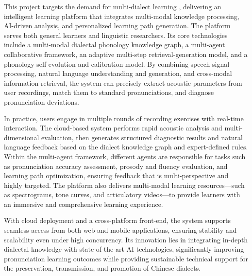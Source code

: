 \begin{abstract*}
This project targets the demand for multi-dialect learning , delivering an intelligent learning platform that integrates multi-modal knowledge processing, AI-driven analysis, and personalized learning path generation. The platform serves both general learners and linguistic researchers. Its core technologies include a multi-modal dialectal phonology knowledge graph, a multi-agent collaborative framework, an adaptive multi-step retrieval-generation model, and a phonology self-evolution and calibration model. By combining speech signal processing, natural language understanding and generation, and cross-modal information retrieval, the system can precisely extract acoustic parameters from user recordings, match them to standard pronunciations, and diagnose pronunciation deviations.

In practice, users engage in multiple rounds of recording exercises with real-time interaction. The cloud-based system performs rapid acoustic analysis and multi-dimensional evaluation, then generates structured diagnostic results and natural language feedback based on the dialect knowledge graph and expert-defined rules. Within the multi-agent framework, different agents are responsible for tasks such as pronunciation accuracy assessment, prosody and fluency evaluation, and learning path optimization, ensuring feedback that is multi-perspective and highly targeted. The platform also delivers multi-modal learning resources—such as spectrograms, tone curves, and articulatory videos—to provide learners with an immersive and comprehensive learning experience.

With cloud deployment and a cross-platform front-end, the system supports seamless access from both web and mobile applications, ensuring stability and scalability even under high concurrency. Its innovation lies in integrating in-depth dialectal knowledge with state-of-the-art AI technologies, significantly improving pronunciation learning outcomes while providing sustainable technical support for the preservation, transmission, and promotion of Chinese dialects.
\end{abstract*}

